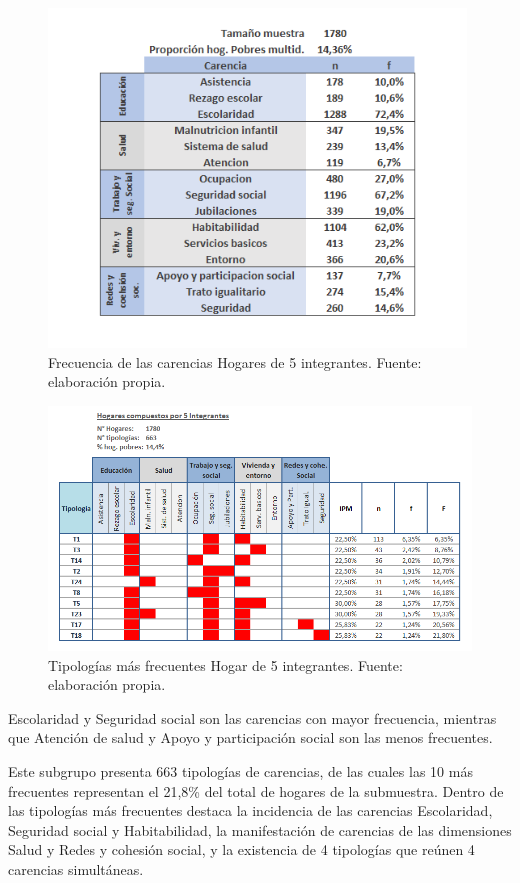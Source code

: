 \documentclass[12pt,letterpaper,spanish]{article}
\begin{document}
\begin{itemize}
    \begin{figure}[H]
        \centering
        \includegraphics[height=9cm]{HOGARES/tabla_num5.png}
        \caption{Frecuencia de las carencias Hogares de 5 integrantes. Fuente: elaboración propia.}
        \label{fren5}
    \end{figure}
    \begin{figure}[H]
        \centering
        \includegraphics[width=\textwidth]{Mati N/n=5.png}
        \caption{Tipologías más frecuentes Hogar de 5 integrantes. Fuente: elaboración propia.}
        \label{tipn5}
    \end{figure}
    Escolaridad y Seguridad social son las carencias con mayor frecuencia, mientras que Atención de salud y Apoyo y participación social son las menos frecuentes.
    
    Este subgrupo presenta 663 tipologías de carencias, de las cuales las 10 más frecuentes representan el 21,8\% del total de hogares de la submuestra. Dentro de las tipologías más frecuentes destaca la incidencia de las carencias Escolaridad, Seguridad social y Habitabilidad, la manifestación de carencias de las dimensiones Salud y Redes y cohesión social, y la existencia de 4 tipologías que reúnen 4 carencias simultáneas. 
    

\end{itemize}
\end{document}
